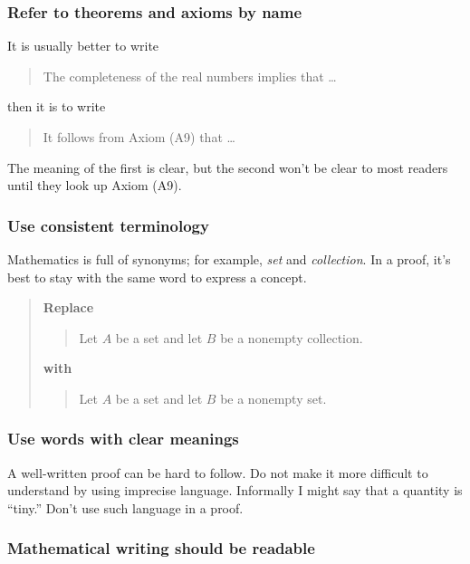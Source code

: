 \documentclass[12pt]{article}
\newcounter{ex}\setcounter{ex}{0}
\newcounter{se}\setcounter{se}{0}
\begin{document}
 \subsubsection{  Refer to theorems and axioms by name}  

It is usually better to write
\begin{quote}
The completeness of the real numbers implies that \dots
\end{quote}
then it is to write
\begin{quote}
 It follows from Axiom  (A9) that \dots
\end{quote}
The meaning of the first is clear, but the second won't be clear
to most readers until they look up Axiom (A9).

 \subsubsection{  Use consistent terminology}

Mathematics is full of synonyms; for example, \emph{set} and 
\emph{collection}. In a proof, it's best to stay with the
same word to express a concept.

\begin{quote}
\textbf{Replace}
\begin{quote}
Let \(A\) be a set and let \(B\) be a nonempty collection.
\end{quote}
\textbf{with}
\begin{quote}
Let \(A\) be a set and let \(B\) be a nonempty set.
\end{quote}
\end{quote}


 \subsubsection{  Use words with clear meanings}

A \mbox{well-written} proof can be hard to follow. Do not make it more
difficult to understand by using imprecise language.  Informally 
I might say that a quantity is ``tiny.'' Don't use such language in a proof.



 \subsubsection{ Mathematical writing should be readable}
\end{document}
